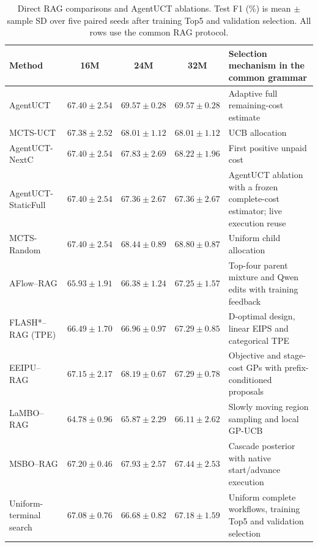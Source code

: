 \begin{table}[t]
\centering\small
\caption{Direct RAG comparisons and AgentUCT ablations. Test F1 (\%) is mean
$\pm$ sample SD over five paired seeds after training Top5 and validation
selection. All rows use the common RAG protocol.}
\label{tab:direct-algorithm-coverage-complete}
\begin{tabularx}{\textwidth}{@{}lcccX@{}}
\toprule
Method & 16M & 24M & 32M & Selection mechanism in the common grammar\\
\midrule
AgentUCT & $67.40\pm2.54$ & $69.57\pm0.28$ & $69.57\pm0.28$ & Adaptive full remaining-cost estimate\\
MCTS-UCT & $67.38\pm2.52$ & $68.01\pm1.12$ & $68.01\pm1.12$ & UCB allocation\\
AgentUCT-NextC & $67.40\pm2.54$ & $67.83\pm2.69$ & $68.22\pm1.96$ & First positive unpaid cost\\
AgentUCT-StaticFull & $67.40\pm2.54$ & $67.36\pm2.67$ & $67.36\pm2.67$ & AgentUCT ablation with a frozen complete-cost estimator; live execution reuse\\
MCTS-Random & $67.40\pm2.54$ & $68.44\pm0.89$ & $68.80\pm0.87$ & Uniform child allocation\\
AFlow--RAG & $65.93\pm1.91$ & $66.38\pm1.24$ & $67.25\pm1.57$ & Top-four parent mixture and Qwen edits with training feedback\\
FLASH*--RAG (TPE) & $66.49\pm1.70$ & $66.96\pm0.97$ & $67.29\pm0.85$ & D-optimal design, linear EIPS and categorical TPE\\
EEIPU--RAG & $67.15\pm2.17$ & $68.19\pm0.67$ & $67.29\pm0.78$ & Objective and stage-cost GPs with prefix-conditioned proposals\\
LaMBO--RAG & $64.78\pm0.96$ & $65.87\pm2.29$ & $66.11\pm2.62$ & Slowly moving region sampling and local GP-UCB\\
MSBO--RAG & $67.20\pm0.46$ & $67.93\pm2.57$ & $67.44\pm2.53$ & Cascade posterior with native start/advance execution\\
Uniform-terminal search & $67.08\pm0.76$ & $66.68\pm0.82$ & $67.18\pm1.59$ & Uniform complete workflows, training Top5 and validation selection\\
\bottomrule
\end{tabularx}
\end{table}

